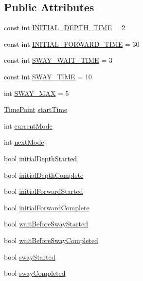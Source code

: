 \subsection*{Public Attributes}
\begin{DoxyCompactItemize}
\item 
const int \hyperlink{classFindBlueBin_a00f192288de5462ada0bda7831e70a05}{I\+N\+I\+T\+I\+A\+L\+\_\+\+D\+E\+P\+T\+H\+\_\+\+T\+I\+ME} = 2
\item 
const int \hyperlink{classFindBlueBin_a7f21bd0be4b937df8d0e0f958bd7ab0c}{I\+N\+I\+T\+I\+A\+L\+\_\+\+F\+O\+R\+W\+A\+R\+D\+\_\+\+T\+I\+ME} = 30
\item 
const int \hyperlink{classFindBlueBin_a9e4fcb40e6f23a68cabd6b751196e4d7}{S\+W\+A\+Y\+\_\+\+W\+A\+I\+T\+\_\+\+T\+I\+ME} = 3
\item 
const int \hyperlink{classFindBlueBin_aad2d5185183373a050f5ac35debb96ad}{S\+W\+A\+Y\+\_\+\+T\+I\+ME} = 10
\item 
int \hyperlink{classFindBlueBin_acebf23fe690d76daa05e0213b779b05a}{S\+W\+A\+Y\+\_\+\+M\+AX} = 5
\item 
\hyperlink{thruster__driver_8cpp_ad3e807c387dc076de974ff7eac67ad81}{Time\+Point} \hyperlink{classFindBlueBin_a7c674712cc11c967d384d53ad50d4510}{start\+Time}
\item 
int \hyperlink{classFindBlueBin_ab8e089264c94424db4809d1e25ccdd71}{current\+Mode}
\item 
int \hyperlink{classFindBlueBin_aa40a2e59ce218d3da4e08cbe3d0828d5}{next\+Mode}
\item 
bool \hyperlink{classFindBlueBin_a16e154133cd0bd892857b86319d6e877}{initial\+Depth\+Started}
\item 
bool \hyperlink{classFindBlueBin_ab6072c5d983e08093828725fe7399786}{initial\+Depth\+Complete}
\item 
bool \hyperlink{classFindBlueBin_a2dc11d69f95da206902d0433f515383f}{initial\+Forward\+Started}
\item 
bool \hyperlink{classFindBlueBin_a8265d0d8e75f90f904df47041b16df86}{initial\+Forward\+Complete}
\item 
bool \hyperlink{classFindBlueBin_a234b002d35a26565afe53744fed13eb6}{wait\+Before\+Sway\+Started}
\item 
bool \hyperlink{classFindBlueBin_ad9e1037722ff8a74b3ca6a326f612f8f}{wait\+Before\+Sway\+Completed}
\item 
bool \hyperlink{classFindBlueBin_aaeb71c1eb1cd445cdd9188668b53e750}{sway\+Started}
\item 
bool \hyperlink{classFindBlueBin_ab64bd6b7d53ecf879bedb985024c656c}{sway\+Completed}

\end{DoxyCompactItemize}
